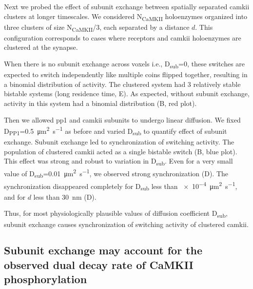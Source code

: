 \documentclass[9pt,lineno]{elife}
\newcommand\SUB[2]{#1\textsubscript{#2}}
\begin{document}
Next we probed the effect of subunit exchange between spatially separated
\gls{camkii} clusters at longer timescales. We considered \SUB{N}{CaMKII}
holoenzymes organized into three clusters of size \SUB{N}{CaMKII}/3, each
separated by a distance \(d\). This configuration corresponds to cases where
receptors and \gls{camkii} holoenzymes are clustered at the synapse. 

When there is no subunit exchange across voxels i.e., \SUB{D}{sub}=0, these
switches are expected to switch independently like multiple coins flipped
together, resulting in a binomial distribution of activity. The clustered system
had 3 relatively stable bistable systems (long residence time,
E). As expected, without subunit exchange, activity in
this system had a binomial distribution (B, red plot). 

Then we allowed \gls{pp1} and \gls{camkii} subunits to undergo linear diffusion.
We fixed \SUB{D}{PP1}=\SI{0.5}{\micro\meter\squared\per\second} as before and
varied \SUB{D}{sub} to quantify effect of subunit exchange.  Subunit exchange
led to synchronization of switching activity. The population of clustered
\gls{camkii} acted as a single bistable switch (B, blue plot).
This effect was strong and robust to variation in \SUB{D}{sub}. Even for a very
small value of \SUB{D}{sub}=\SI{0.01}{\micro\meter\squared\per\second}, we
observed strong synchronization (D). The synchronization
disappeared completely for \SUB{D}{sub} less than
\SI{e-4}{\micro\meter\squared\per\second}, and  for $d$ less than
\SI{30}{\nano\meter} (D).

Thus, for most physiologically plausible values of diffusion coefficient
\SUB{D}{sub}, subunit exchange causes synchronization of switching activity of
clustered \gls{camkii}.

\subsection{Subunit exchange may account for the observed dual decay rate of
    CaMKII phosphorylation}\label{subsec:camkii_decay_two_time_course}
\end{document}
